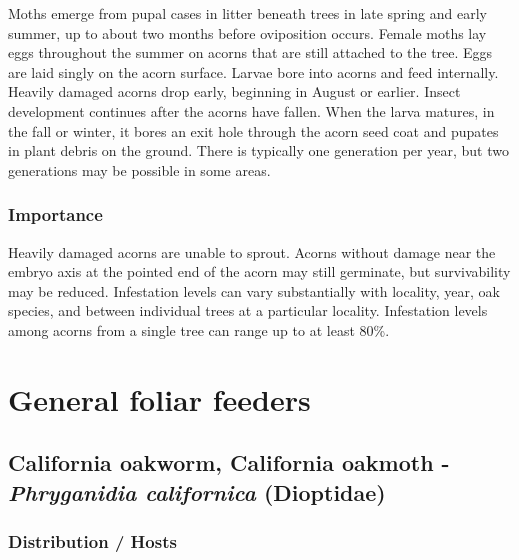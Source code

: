 \documentclass[
]{book}
\begin{document}
Moths emerge from pupal cases in litter beneath trees in late spring and early summer, up to about two months before oviposition occurs. Female moths lay eggs throughout the summer on acorns that are still attached to the tree. Eggs are laid singly on the acorn surface. Larvae bore into acorns and feed internally. Heavily damaged acorns drop early, beginning in August or earlier. Insect development continues after the acorns have fallen. When the larva matures, in the fall or winter, it bores an exit hole through the acorn seed coat and pupates in plant debris on the ground. There is typically one generation per year, but two generations may be possible in some areas.

\subsection*{Importance}\label{importance-1}

Heavily damaged acorns are unable to sprout. Acorns without damage near the embryo axis at the pointed end of the acorn may still germinate, but survivability may be reduced. Infestation levels can vary substantially with locality, year, oak species, and between individual trees at a particular locality. Infestation levels among acorns from a single tree can range up to at least 80\%.

\chapter*{General foliar feeders}\label{general-foliar-feeders}

\section*{\texorpdfstring{California oakworm, California oakmoth - \emph{Phryganidia californica} (Dioptidae)}{California oakworm, California oakmoth - Phryganidia californica (Dioptidae)}}\label{california-oakworm-california-oakmoth---phryganidia-californica-dioptidae}

\subsection*{Distribution / Hosts}\label{distribution-hosts-2}
\end{document}
